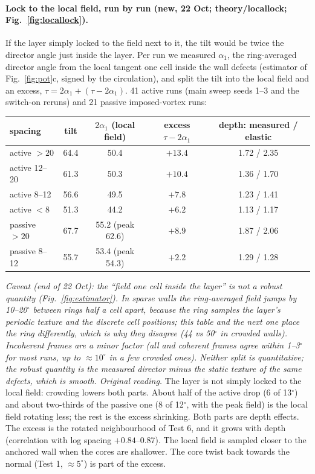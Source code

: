 \documentclass[11pt,a4paper]{article}
\begin{document}
\paragraph{Lock to the local field, run by run (new, 22 Oct; theory/locallock; Fig.~\ref{fig:locallock}).} If the layer simply locked to the field
next to it, the tilt would be twice the director angle just inside the layer. Per run we measured $\alpha_1$, the ring-averaged director angle from the
local tangent one cell inside the wall defects (estimator of Fig.~\ref{fig:pot}c, signed by the circulation), and split the tilt into the local field and
an excess, $\tau=2\alpha_1+(\tau-2\alpha_1)$. 41 active runs (main sweep seeds 1--3 and the switch-on reruns) and 21 passive imposed-vortex runs:
\begin{center}\small
\begin{tabular}{lcccc}\toprule
spacing & tilt & $2\alpha_1$ (local field) & excess $\tau-2\alpha_1$ & depth: measured / elastic\\\midrule
active $>20$ & 64.4 & 50.4 & $+13.4$ & 1.72 / 2.35\\
active 12--20 & 61.3 & 50.3 & $+10.4$ & 1.36 / 1.70\\
active 8--12 & 56.6 & 49.5 & $+7.8$ & 1.23 / 1.41\\
active $<8$ & 51.3 & 44.2 & $+6.2$ & 1.13 / 1.17\\
passive $>20$ & 67.7 & 55.2 (peak 62.6) & $+8.9$ & 1.87 / 2.06\\
passive 8--12 & 55.7 & 53.4 (peak 54.3) & $+2.2$ & 1.29 / 1.28\\\bottomrule
\end{tabular}\end{center}
\emph{Caveat (end of 22 Oct): the ``field one cell inside the layer'' is not a robust quantity (Fig.~\ref{fig:estimator}). In sparse walls the ring-averaged
field jumps by 10--20$^\circ$ between rings half a cell apart, because the ring samples the layer's periodic texture and the discrete cell positions; this table
and the next one place the ring differently, which is why they disagree (44 vs 50$^\circ$ in crowded walls). Incoherent frames are a minor factor (all and
coherent frames agree within 1--3$^\circ$ for most runs, up to $\approx10^\circ$ in a few crowded ones). Neither split is quantitative; the robust quantity is the
measured director minus the static texture of the same defects, which is smooth.}
\emph{Original reading.} The layer is not simply locked to the local field: crowding lowers both parts. About half of the active drop (6 of 13$^\circ$) and about
two-thirds of the passive one (8 of 12$^\circ$, with the peak field) is the local field rotating less; the rest is the excess shrinking. Both parts
are depth effects. The excess is the rotated neighbourhood of Test 6, and it grows with depth (correlation with log spacing $+0.84$--0.87). The local
field is sampled closer to the anchored wall when the cores are shallower. The core twist back towards the normal (Test 1, $\approx5^\circ$) is part of the
excess.
\end{document}
